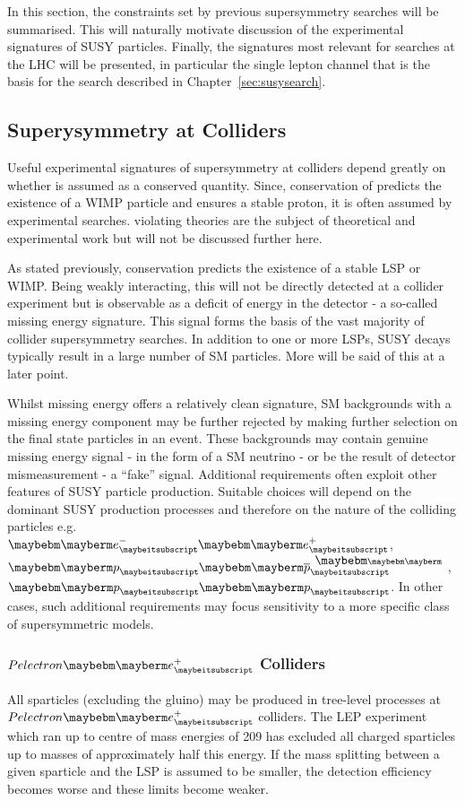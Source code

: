 In this section, the constraints set by previous supersymmetry searches will be
summarised. This will naturally motivate discussion of the experimental
signatures of \ac{SUSY} particles. Finally, the signatures most relevant for
searches at the \ac{LHC} will be presented, in particular the single lepton
channel that is the basis for the search described in
Chapter~\ref{sec:susysearch}.

\subsection{Superysymmetry at Colliders}
Useful experimental signatures of supersymmetry at colliders depend greatly on
whether \Rparity is assumed as a conserved quantity. Since, conservation of
\Rparity predicts the existence of a \ac{WIMP} particle and ensures a stable
proton, it is often assumed by experimental searches. \Rparity violating
theories are the subject of theoretical \cite{aulakh_rpv} and experimental work
but will not be discussed further here.

As stated previously, \Rparity conservation predicts the existence of a stable
\ac{LSP} or \ac{WIMP}. Being weakly interacting, this will not be directly
detected at a collider experiment but is observable as a deficit of energy in
the detector - a so-called missing energy signature. This signal forms the basis
of the vast majority of collider supersymmetry searches. In addition to one or
more \acp{LSP}, \ac{SUSY} decays typically result in a large number of \ac{SM}
particles. More will be said of this at a later point.

Whilst missing energy offers a relatively clean signature, \ac{SM} backgrounds
with a missing energy component may be further rejected by making further
selection on the final state particles in an event. These backgrounds may
contain genuine missing energy signal - in the form of a \ac{SM} neutrino - or
be the result of detector mismeasurement - a ``fake'' signal. Additional
requirements often exploit other features of \ac{SUSY} particle
production. Suitable choices will depend on the dominant \ac{SUSY} production
processes and therefore on the nature of the colliding particles
e.g. $\Pelectron\APelectron$, $\Pproton\APproton$, $\Pproton\Pproton$. In other
cases, such additional requirements may focus sensitivity to a more specific
class of supersymmetric models.

\subsubsection{$Pelectron\APelectron$ Colliders}
All sparticles (excluding the gluino) may be produced in tree-level processes at
$Pelectron\APelectron$ colliders\cite{susy_primer}. The \ac{LEP} experiment
which ran up to centre of mass energies of \unit{209}{\GeV} has excluded all
charged sparticles up to masses of approximately half this energy. If the mass
splitting between a given sparticle and the \ac{LSP} is assumed to be smaller,
the detection efficiency becomes worse and these limits become weaker.

